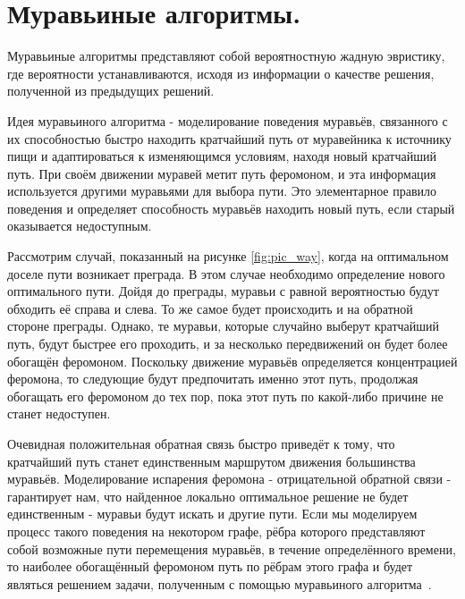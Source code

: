 \documentclass[a4paper,oneside,14pt]{extreport}
\begin{document}
\section{Муравьиные алгоритмы.}
Муравьиные алгоритмы представляют собой вероятностную жадную эвристику, где вероятности устанавливаются, исходя из информации о качестве решения, полученной из предыдущих решений.

Идея муравьиного алгоритма - моделирование поведения муравьёв, связанного с их способностью быстро находить кратчайший путь от муравейника к источнику пищи и адаптироваться к изменяющимся условиям, находя новый кратчайший путь. При своём движении муравей метит путь феромоном, и эта информация используется другими муравьями для выбора пути. Это элементарное правило поведения и определяет способность муравьёв находить новый путь, если старый оказывается недоступным.

Рассмотрим случай, показанный на рисунке \ref{fig:pic_way}, когда на оптимальном доселе пути возникает преграда. В этом случае необходимо определение нового оптимального пути. Дойдя до преграды, муравьи с равной вероятностью будут обходить её справа и слева. То же самое будет происходить и на обратной стороне преграды. Однако, те муравьи, которые случайно выберут кратчайший путь, будут быстрее его проходить, и за несколько передвижений он будет более обогащён феромоном. Поскольку движение муравьёв определяется концентрацией феромона, то следующие будут предпочитать именно этот путь, продолжая обогащать его феромоном до тех пор, пока этот путь по какой-либо причине не станет недоступен.

Очевидная положительная обратная связь быстро приведёт к тому, что кратчайший путь станет единственным маршрутом движения большинства муравьёв. Моделирование испарения феромона - отрицательной обратной связи - гарантирует нам, что найденное локально оптимальное решение не будет единственным - муравьи будут искать и другие пути. Если мы моделируем процесс такого поведения на некотором графе, рёбра которого представляют собой возможные пути перемещения муравьёв, в течение определённого времени, то наиболее обогащённый феромоном путь по рёбрам этого графа и будет являться решением задачи, полученным с помощью муравьиного алгоритма~\cite{2}.
\end{document}
